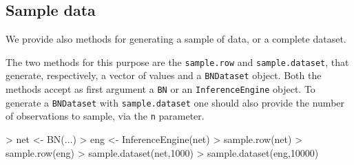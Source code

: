 \documentclass{article}
\newcommand{\Robject}[1]{{\texttt{#1}}}
\newcommand{\Rmethod}[1]{{\texttt{#1}}}
\newcommand{\Rfunarg}[1]{{\texttt{#1}}}
\begin{document}
\subsection{Sample data}
We provide also methods for generating a sample of data, or a complete dataset.

The two methods for this purpose are the \Rmethod{sample.row} and \Rmethod{sample.dataset}, that generate, respectively,
a vector of values and a \Robject{BNDataset} object. Both the methods accept as first argument a \Robject{BN} or an
\Robject{InferenceEngine} object. To generate a \Robject{BNDataset} with \Rmethod{sample.dataset} one should also provide the
number of observations to sample, via the \Rfunarg{n} parameter.

\begin{Schunk}
\begin{Sinput}
> net <- BN(...)
> eng <- InferenceEngine(net)
> sample.row(net)
> sample.row(eng)
> sample.dataset(net,1000)
> sample.dataset(eng,10000)
\end{Sinput}
\end{Schunk}




\end{document}
